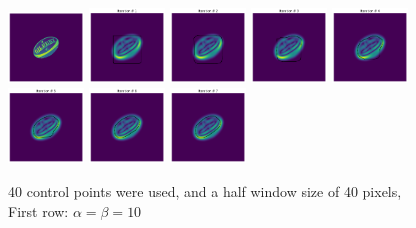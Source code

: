 \documentclass[24pt]{article}
\begin{document}
\begin{figure}[h!]
\includegraphics[width=0.18\textwidth]{Rugby_im.png}
\includegraphics[width=0.18\textwidth]{Rugby_it_1.png}
\includegraphics[width=0.18\textwidth]{Rugby_it_2.png}
\includegraphics[width=0.18\textwidth]{Rugby_it_3.png}
\includegraphics[width=0.18\textwidth]{Rugby_it_4.png}
\includegraphics[width=0.18\textwidth]{Rugby_it_5.png}
\includegraphics[width=0.18\textwidth]{Rugby_it_6.png}
\includegraphics[width=0.18\textwidth]{Rugby_it_7.png}
\caption{40 control points were used, and a half window size of 40 pixels, First row: $\alpha= \beta = 10$}
\label{fig:snake_resultsv2}
\end{figure}
\end{document}
